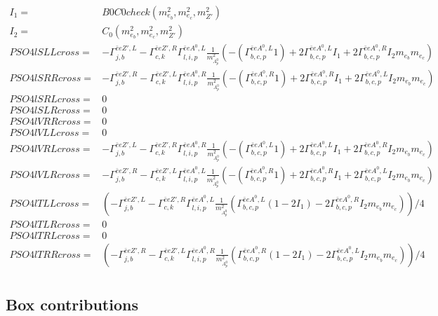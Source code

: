 \documentclass[A4,landscape]{article}
\begin{document}
\begin{align} 
I_1= & B0C0check(m^2_{e_{{b}}}, m^2_{e_{{c}}}, m^2_{{Z'}}) \\ 
I_2= & C_0(m^2_{e_{{b}}}, m^2_{e_{{c}}}, m^2_{{Z'}}) \\ 
  PSO4lSLLcross= &  - \Gamma^{\bar{e}e {Z'} ,L} _{j, b} - \Gamma^{\bar{e}e {Z'} ,R} _{c, k} \Gamma^{\bar{e}e A^0 ,L}_{l, i, p} \frac{1}{m^2_{A^0_{{p}}}} (-(\Gamma^{\bar{e}e A^0 ,L}_{b, c, p} 1) + 2 \Gamma^{\bar{e}e A^0 ,L}_{b, c, p} I_1 + 2 \Gamma^{\bar{e}e A^0 ,R}_{b, c, p} I_2 m_{e_{{b}}} m_{e_{{c}}}) \\ 
  PSO4lSRRcross= &  - \Gamma^{\bar{e}e {Z'} ,R} _{j, b} - \Gamma^{\bar{e}e {Z'} ,L} _{c, k} \Gamma^{\bar{e}e A^0 ,R}_{l, i, p} \frac{1}{m^2_{A^0_{{p}}}} (-(\Gamma^{\bar{e}e A^0 ,R}_{b, c, p} 1) + 2 \Gamma^{\bar{e}e A^0 ,R}_{b, c, p} I_1 + 2 \Gamma^{\bar{e}e A^0 ,L}_{b, c, p} I_2 m_{e_{{b}}} m_{e_{{c}}}) \\ 
  PSO4lSRLcross= & 0 \\ 
  PSO4lSLRcross= & 0 \\ 
  PSO4lVRRcross= & 0 \\ 
  PSO4lVLLcross= & 0 \\ 
  PSO4lVRLcross= &  - \Gamma^{\bar{e}e {Z'} ,L} _{j, b} - \Gamma^{\bar{e}e {Z'} ,R} _{c, k} \Gamma^{\bar{e}e A^0 ,R}_{l, i, p} \frac{1}{m^2_{A^0_{{p}}}} (-(\Gamma^{\bar{e}e A^0 ,L}_{b, c, p} 1) + 2 \Gamma^{\bar{e}e A^0 ,L}_{b, c, p} I_1 + 2 \Gamma^{\bar{e}e A^0 ,R}_{b, c, p} I_2 m_{e_{{b}}} m_{e_{{c}}}) \\ 
  PSO4lVLRcross= &  - \Gamma^{\bar{e}e {Z'} ,R} _{j, b} - \Gamma^{\bar{e}e {Z'} ,L} _{c, k} \Gamma^{\bar{e}e A^0 ,L}_{l, i, p} \frac{1}{m^2_{A^0_{{p}}}} (-(\Gamma^{\bar{e}e A^0 ,R}_{b, c, p} 1) + 2 \Gamma^{\bar{e}e A^0 ,R}_{b, c, p} I_1 + 2 \Gamma^{\bar{e}e A^0 ,L}_{b, c, p} I_2 m_{e_{{b}}} m_{e_{{c}}}) \\ 
  PSO4lTLLcross= & ( - \Gamma^{\bar{e}e {Z'} ,L} _{j, b} - \Gamma^{\bar{e}e {Z'} ,R} _{c, k} \Gamma^{\bar{e}e A^0 ,L}_{l, i, p} \frac{1}{m^2_{A^0_{{p}}}} (\Gamma^{\bar{e}e A^0 ,L}_{b, c, p} (1 - 2 I_1) - 2 \Gamma^{\bar{e}e A^0 ,R}_{b, c, p} I_2 m_{e_{{b}}} m_{e_{{c}}}))/4 \\ 
  PSO4lTLRcross= & 0 \\ 
  PSO4lTRLcross= & 0 \\ 
  PSO4lTRRcross= & ( - \Gamma^{\bar{e}e {Z'} ,R} _{j, b} - \Gamma^{\bar{e}e {Z'} ,L} _{c, k} \Gamma^{\bar{e}e A^0 ,R}_{l, i, p} \frac{1}{m^2_{A^0_{{p}}}} (\Gamma^{\bar{e}e A^0 ,R}_{b, c, p} (1 - 2 I_1) - 2 \Gamma^{\bar{e}e A^0 ,L}_{b, c, p} I_2 m_{e_{{b}}} m_{e_{{c}}}))/4 \\ 
\end{align} 
\subsection{Box contributions} 
\end{document}

